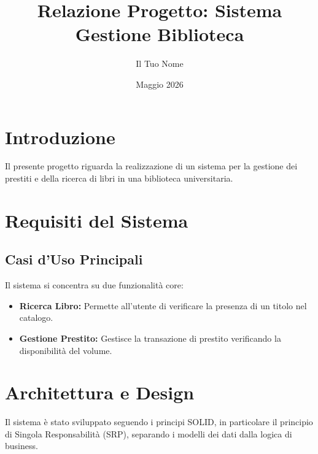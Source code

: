 \documentclass[12pt, a4paper]{article}
\title{Relazione Progetto: Sistema Gestione Biblioteca}
\author{Il Tuo Nome}
\date{Maggio 2026}
\begin{document}
\maketitle

\section{Introduzione}
Il presente progetto riguarda la realizzazione di un sistema per la gestione dei prestiti e della ricerca di libri in una biblioteca universitaria.

\section{Requisiti del Sistema}
\subsection{Casi d'Uso Principali}
Il sistema si concentra su due funzionalità core:
\begin{itemize}
    \item \textbf{Ricerca Libro:} Permette all'utente di verificare la presenza di un titolo nel catalogo.
    \item \textbf{Gestione Prestito:} Gestisce la transazione di prestito verificando la disponibilità del volume.
\end{itemize}


\section{Architettura e Design}
Il sistema è stato sviluppato seguendo i principi SOLID, in particolare il principio di Singola Responsabilità (SRP), separando i modelli dei dati dalla logica di business.
\end{document}
